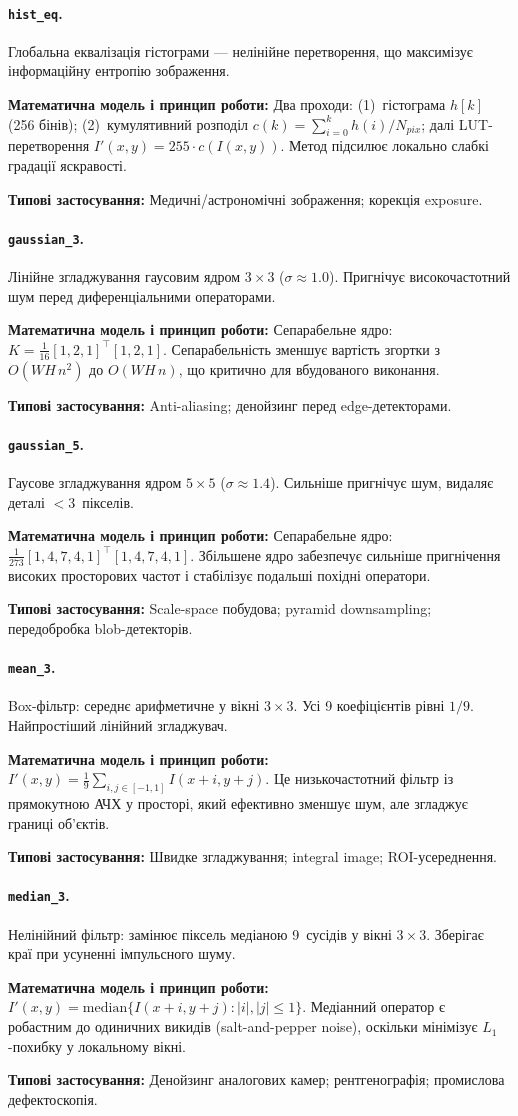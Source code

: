 \documentclass[a4paper,12pt]{article}
\newcommand{\algodesc}[6]{%
	\paragraph{\texttt{#1}.} #2

	\textbf{Математична модель і принцип роботи:} #3

	\textbf{Типові застосування:} #6
	\par\medskip
}
\begin{document}
\algodesc{hist\_eq}
{Глобальна еквалізація гістограми --- нелінійне перетворення, що максимізує інформаційну ентропію зображення.}
{Два проходи: (1)~гістограма $h[k]$ (256 бінів); (2)~кумулятивний розподіл $c(k)=\sum_{i=0}^{k}h(i)/N_{pix}$; далі LUT-перетворення $I'(x,y)=255\cdot c(I(x,y))$. Метод підсилює локально слабкі градації яскравості.}
{Покращує контраст у тьмяних/переекспонованих кадрах; один прохід + LUT.}
{Може підсилювати шум у однорідних областях через розтягнення локальних градацій.}
{Медичні/астрономічні зображення; корекція exposure.}

\algodesc{gaussian\_3}
{Лінійне згладжування гаусовим ядром $3\times3$ ($\sigma\approx1.0$). Пригнічує високочастотний шум перед диференціальними операторами.}
{Сепарабельне ядро: $K=\frac{1}{16}[1,2,1]^\top[1,2,1]$. Сепарабельність зменшує вартість згортки з \(O(WH\,n^2)\) до \(O(WH\,n)\), що критично для вбудованого виконання.}
{Оптимальний баланс $\sigma_x\cdot\sigma_\omega$; дешева sep. реалізація; стандартний передобробник Canny, LoG.}
{Розмиває контури; не зберігає краї; halo=1.}
{Anti-aliasing; денойзинг перед edge-детекторами.}

\algodesc{gaussian\_5}
{Гаусове згладжування ядром $5\times5$ ($\sigma\approx1.4$). Сильніше пригнічує шум, видаляє деталі $<$3~пікселів.}
{Сепарабельне ядро: $\frac{1}{273}[1,4,7,4,1]^\top[1,4,7,4,1]$. Збільшене ядро забезпечує сильніше пригнічення високих просторових частот і стабілізує подальші похідні оператори.}
{Сильніше шумоподавлення; основа scale-space (DoG, pyramid).}
{Більший halo та сильніше згладжування можуть видаляти тонкі лінійні структури.}
{Scale-space побудова; pyramid downsampling; передобробка blob-детекторів.}

\algodesc{mean\_3}
{Box-фільтр: середнє арифметичне у вікні $3\times3$. Усі 9 коефіцієнтів рівні $1/9$. Найпростіший лінійний згладжувач.}
{$I'(x,y)=\frac{1}{9}\sum_{i,j\in[-1,1]}I(x+i,y+j)$. Це низькочастотний фільтр із прямокутною АЧХ у просторі, який ефективно зменшує шум, але згладжує границі об'єктів.}
{Простий і стабільний у реалізації; добре пригнічує дрібний шум у рівномірних областях.}
{<<Блочні>> артефакти; sinc-форма АЧХ (ringing у спектрі).}
{Швидке згладжування; integral image; ROI-усереднення.}

\algodesc{median\_3}
{Нелінійний фільтр: замінює піксель медіаною 9~сусідів у вікні $3\times3$. Зберігає краї при усуненні імпульсного шуму.}
{$I'(x,y)=\mathrm{median}\{I(x+i,y+j): |i|,|j|\le1\}$. Медіанний оператор є робастним до одиничних викидів (salt-and-pepper noise), оскільки мінімізує \(L_1\)-похибку у локальному вікні.}
{Зберігає межі об'єктів і ефективно усуває імпульсний шум.}
{Несепарабельний; $O(n^2\log n)$ замість $O(n^2)$.}
{Денойзинг аналогових камер; рентгенографія; промислова дефектоскопія.}
\end{document}
